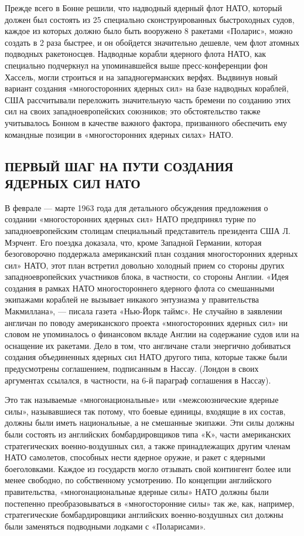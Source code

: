 \documentclass[12pt, a4paper, openany]{book}
\begin{document}
Прежде всего в Бонне решили, что надводный ядерный флот НАТО, который должен был состоять из 25 специально сконструированных быстроходных судов, каждое из которых должно было быть вооружено 8 ракетами «Поларис», можно создать в 2 раза быстрее, и он обойдется значительно дешевле, чем флот атомных подводных ракетоносцев. Надводные корабли ядерного флота НАТО, как специально подчеркнул на упоминавшейся выше пресс-конференции фон Хассель, могли строиться и на западногерманских верфях. Выдвинув новый вариант создания «многосторонних ядерных сил» на базе надводных кораблей, США рассчитывали переложить значительную часть бремени по созданию этих сил на своих западноевропейских союзников; это обстоятельство также учитывалось Бонном в качестве важного фактора, призванного обеспечить ему командные позиции в «многосторонних ядерных силах» НАТО.

	\subsection[Первый шаг на пути создания ядерных сил НАТО]{\center ПЕРВЫЙ ШАГ НА ПУТИ СОЗДАНИЯ ЯДЕРНЫХ СИЛ НАТО}


В феврале — марте 1963 года для детального обсуждения предложения о создании «многосторонних ядерных сил» НАТО предпринял турне по западноевропейским столицам специальный представитель президента США Л. Мэрчент. Его поездка доказала, что, кроме Западной Германии, которая безоговорочно поддержала американский план создания многосторонних ядерных сил» НАТО, этот план встретил довольно холодный прием со стороны других западноевропейских участников блока, в частности, со стороны Англии. «Идея создания в рамках НАТО многостороннего ядерного флота со смешанными экипажами кораблей не вызывает никакого энтузиазма у правительства Макмиллана», — писала газета «Нью-Йорк таймс». Не случайно в заявлении англичан по поводу американского проекта «многосторонних ядерных сил» ни словом не упоминалось о финансовом вкладе Англии на содержание судов или на оснащение их ракетами. Дело в том, что англичане стали энергично добиваться создания объединенных ядерных сил НАТО другого типа, которые также были предусмотрены соглашением, подписанным в Нассау. (Лондон в своих аргументах ссылался, в частности, на 6-й параграф соглашения в Нассау).


Это так называемые «многонациональные» или «межсоюзнические ядерные силы», называвшиеся так потому, что боевые единицы, входящие в их состав, должны были иметь национальные, а не смешанные экипажи. Эти силы должны были состоять из английских бомбардировщиков типа «К», части американских стратегических военно-воздушных сил, а также принадлежащих другим членам НАТО самолетов, способных нести ядерное оружие, и ракет с ядерными боеголовками. Каждое из государств могло отзывать свой контингент более или менее свободно, по собственному усмотрению. По концепции английского правительства, «многонациональные ядерные силы» НАТО должны были постепенно преобразовываться в «многосторонние силы» так же, как, например, стратегические бомбардировщики английских военно-воздушных сил должны были заменяться подводными лодками с «Поларисами».
\end{document}

